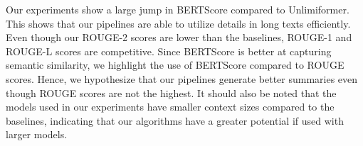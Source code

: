 \documentclass[letterpaper]{article} %
\begin{document}
  Our experiments show a large jump in BERTScore compared to Unlimiformer.
  This shows that our pipelines are able to utilize details in long texts efficiently.
  Even though our ROUGE-2 scores are lower than the baselines, ROUGE-1 and ROUGE-L scores are
  competitive.
  Since BERTScore is better at capturing semantic similarity, we highlight the use of BERTScore
  compared to ROUGE scores.
  Hence, we hypothesize that our pipelines generate better summaries even though ROUGE scores are
  not the highest.
  It should also be noted that the models used in our experiments have smaller context sizes
  compared to the baselines, indicating that our algorithms have a greater potential if
  used with larger models.



% 
\end{document}
